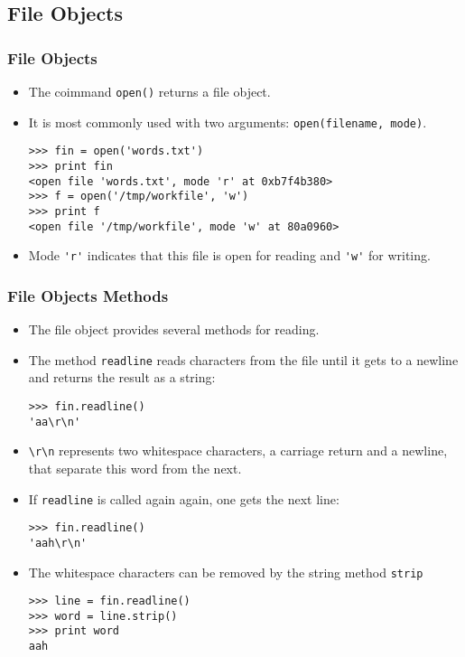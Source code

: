 \documentclass[handout]{beamer}
\newcommand{\beforeverb}{\footnotesize}
\newcommand{\afterverb}{\normalsize}
\begin{document}
\subsection[File Objects]{File Objects}
\begin{frame}[fragile]
\frametitle{File Objects}
\begin{itemize}

\item The coimmand {\tt open()} returns a \alert{file object}.
\item It is most commonly used with two arguments: {\tt open(filename, mode)}.
\beforeverb
\begin{verbatim}
>>> fin = open('words.txt')
>>> print fin
<open file 'words.txt', mode 'r' at 0xb7f4b380>
>>> f = open('/tmp/workfile', 'w')
>>> print f 
<open file '/tmp/workfile', mode 'w' at 80a0960> 
\end{verbatim}
\afterverb
\item Mode \verb"'r'" indicates that this file is open for
reading and \verb"'w'" for writing.

\end{itemize}

\end{frame}
\begin{frame}[fragile]
\frametitle{File Objects Methods}
\begin{itemize}
\item The file object provides several methods for reading.
\item The method {\tt readline}  reads characters from the file
until it gets to a \alert{newline} and returns the result as a
string:
\beforeverb
\begin{verbatim}
>>> fin.readline()
'aa\r\n'
\end{verbatim}
\afterverb
%
\item  \verb"\r\n" represents two whitespace characters,
a \alert{carriage return} and a \alert{newline}, that separate this word from the
next.
\item If {\tt readline} is called again again, one gets the next line:
\beforeverb
\begin{verbatim}
>>> fin.readline()
'aah\r\n'
\end{verbatim}
\afterverb
\item The whitespace characters can be removed by the string method {\tt strip}
\beforeverb
\begin{verbatim}
>>> line = fin.readline()
>>> word = line.strip()
>>> print word
aah
\end{verbatim}
\afterverb
\end{itemize}
\end{frame}
\end{document}
